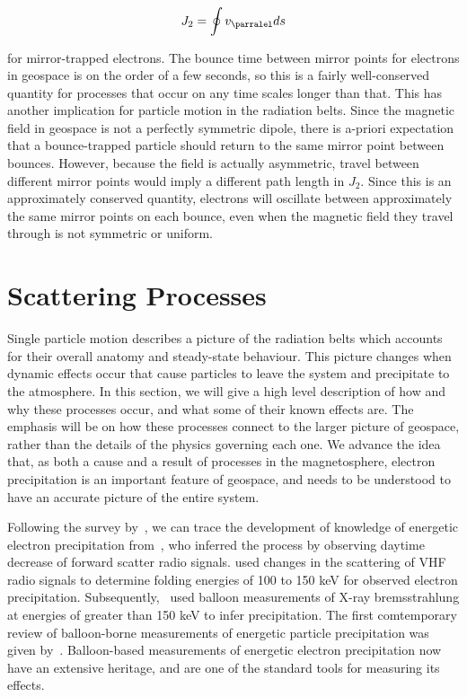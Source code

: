 $$J_2 = \oint v_{\parralel}ds$$

for mirror-trapped electrons. The bounce time between mirror points for electrons in geospace is on the order of a few seconds, so this is a fairly well-conserved quantity for processes that occur on any time scales longer than that. This has another implication for particle motion in the radiation belts. Since the magnetic field in geospace is not a perfectly symmetric dipole, there is a-priori expectation that a bounce-trapped particle should return to the same mirror point between bounces. However, because the field is actually asymmetric, travel between different mirror points would imply a different path length in $J_2$. Since this is an approximately conserved quantity, electrons will oscillate between approximately the same mirror points on each bounce, even when the magnetic field they travel through is not symmetric or uniform.

\section{Scattering Processes}

Single particle motion describes a picture of the radiation belts which accounts for their overall anatomy and steady-state behaviour. This picture changes when dynamic effects occur that cause particles to leave the system and precipitate to the atmosphere. In this section, we will give a high level description of how and why these processes occur, and what some of their known effects are. The emphasis will be on how these processes connect to the larger picture of geospace, rather than the details of the physics governing each one. We advance the idea that, as both a cause and a result of processes in the magnetosphere, electron precipitation is an important feature of geospace, and needs to be understood to have an accurate picture of the entire system. 

Following the survey by~\cite{Millan2007a}, we can trace the development of knowledge of energetic electron precipitation from~\cite{Bailey1968}, who inferred the process by observing daytime decrease of forward scatter radio signals. \cite{rosenberg1972} used changes in the scattering of VHF radio signals to determine folding energies of 100 to 150 keV for observed electron precipitation. Subsequently,~\cite{parks1979} used balloon measurements of X-ray bremsstrahlung at energies of greater than 150 keV to infer precipitation. The first comtemporary review of balloon-borne measurements of energetic particle precipitation was given by~\cite{parks1993}. Balloon-based measurements of energetic electron precipitation now have an extensive heritage, and are one of the standard tools for measuring its effects. 

